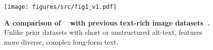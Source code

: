\begin{figure}
    \centering
    \texttt{[image: figures/src/fig1\_v1.pdf]}
    \caption{
    \textbf{A comparison of \DatasetName~ with previous text-rich image datasets~\cite{laion,anytext,textdiffuser}.}  
    Unlike prior datasets with short or unstructured alt-text, \DatasetName features more diverse, complex long-form text.
    }
    \label{fig:motivation}
\end{figure}